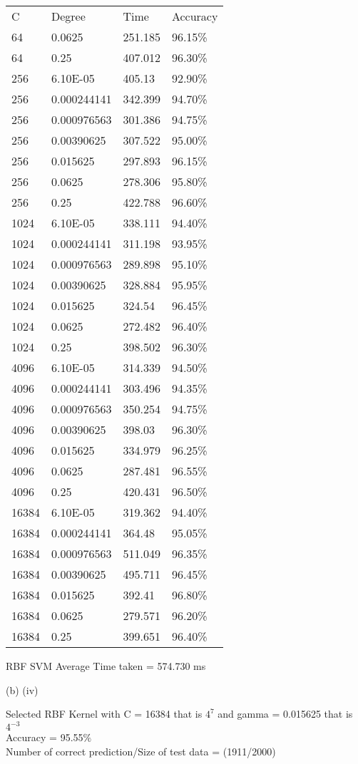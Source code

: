 \documentclass[12pt]{article}
\newenvironment{problem}[2][Problem]{\begin{trivlist}
\item[\hskip \labelsep {\bfseries #1}\hskip \labelsep {\bfseries #2.}]}{\end{trivlist}}
\begin{document}
\begin{Answer}
\begin{table}
\begin{tabular}{llll}
C        & Degree & Time     & Accuracy \\
64       & 0.0625      & 251.185  & 96.15\%  \\
64       & 0.25        & 407.012  & 96.30\%  \\
256   & 6.10E-05    & 405.13  & 92.90\% \\
256   & 0.000244141 & 342.399 & 94.70\% \\
256   & 0.000976563 & 301.386 & 94.75\% \\
256   & 0.00390625  & 307.522 & 95.00\% \\
256   & 0.015625    & 297.893 & 96.15\% \\
256   & 0.0625      & 278.306 & 95.80\% \\
256   & 0.25        & 422.788 & 96.60\% \\
1024  & 6.10E-05    & 338.111 & 94.40\% \\
1024  & 0.000244141 & 311.198 & 93.95\% \\
1024  & 0.000976563 & 289.898 & 95.10\% \\
1024  & 0.00390625  & 328.884 & 95.95\% \\
1024  & 0.015625    & 324.54  & 96.45\% \\
1024  & 0.0625      & 272.482 & 96.40\% \\
1024  & 0.25        & 398.502 & 96.30\% \\
4096  & 6.10E-05    & 314.339 & 94.50\% \\
4096  & 0.000244141 & 303.496 & 94.35\% \\
4096  & 0.000976563 & 350.254 & 94.75\% \\
4096  & 0.00390625  & 398.03  & 96.30\% \\
4096  & 0.015625    & 334.979 & 96.25\% \\
4096  & 0.0625      & 287.481 & 96.55\% \\
4096  & 0.25        & 420.431 & 96.50\% \\
16384 & 6.10E-05    & 319.362 & 94.40\% \\
16384 & 0.000244141 & 364.48  & 95.05\% \\
16384 & 0.000976563 & 511.049 & 96.35\% \\
16384 & 0.00390625  & 495.711 & 96.45\% \\
16384 & 0.015625    & 392.41  & 96.80\% \\
16384 & 0.0625      & 279.571 & 96.20\% \\
16384 & 0.25        & 399.651 & 96.40\%
\end{tabular}
\end{table}
RBF SVM Average Time taken = 574.730 ms\\
\end{Answer}

\begin{problem} 6 (b) (iv)
\end{problem}
\begin{Answer}
Selected RBF Kernel with C = 16384 that is $4^{7}$ and gamma = 0.015625 that is $4^{-3}$ \\
Accuracy = 95.55$\%$  \\
Number of correct prediction/Size of test    data = (1911/2000)
\end{Answer}
\end{document}
